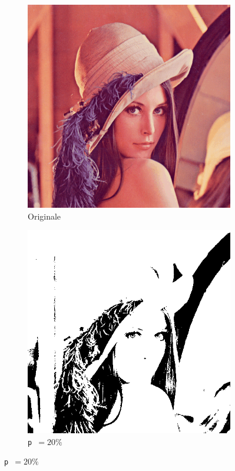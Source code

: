 \documentclass[12pt]{article}
\begin{document}
    \begin{figure}[H]
      \centering
      \begin{subfigure}[b]{0.33\textwidth}
        \centering
        \includegraphics[width=\textwidth]{lena.png}
        \caption*{Originale}
      \end{subfigure}
      \hspace{0.15\textwidth}
      \begin{subfigure}[b]{0.33\textwidth}
        \centering
        \includegraphics[width=\textwidth]{img/lena-threshold-20.png}
        \caption*{\texttt{p }\( = 20\%\)}
      \end{subfigure}


\end{figure}
\end{document}
